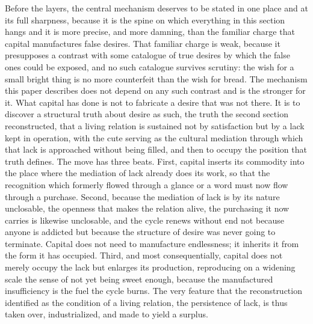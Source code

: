 Before the layers, the central mechanism deserves to be stated in one place and at its full sharpness, because it is the spine on which everything in this section hangs and it is more precise, and more damning, than the familiar charge that capital manufactures false desires. That familiar charge is weak, because it presupposes a contrast with some catalogue of true desires by which the false ones could be exposed, and no such catalogue survives scrutiny: the wish for a small bright thing is no more counterfeit than the wish for bread. The mechanism this paper describes does not depend on any such contrast and is the stronger for it. What capital has done is not to fabricate a desire that was not there. It is to discover a structural truth about desire as such, the truth the second section reconstructed, that a living relation is sustained not by satisfaction but by a lack kept in operation, with the cute serving as the cultural mediation through which that lack is approached without being filled, and then to occupy the position that truth defines. The move has three beats. First, capital inserts its commodity into the place where the mediation of lack already does its work, so that the recognition which formerly flowed through a glance or a word must now flow through a purchase. Second, because the mediation of lack is by its nature unclosable, the openness that makes the relation alive, the purchasing it now carries is likewise unclosable, and the cycle renews without end not because anyone is addicted but because the structure of desire was never going to terminate. Capital does not need to manufacture endlessness; it inherits it from the form it has occupied. Third, and most consequentially, capital does not merely occupy the lack but enlarges its production, reproducing on a widening scale the sense of not yet being sweet enough, because the manufactured insufficiency is the fuel the cycle burns. The very feature that the reconstruction identified as the condition of a living relation, the persistence of lack, is thus taken over, industrialized, and made to yield a surplus.

